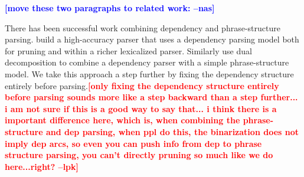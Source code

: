 \documentclass[11pt,letterpaper]{article}
\newcommand{\rules}{\mathcal{R}}
\newcommand{\ParseName}{\textsc{ParPar}}
\newcommand{\lpkcomment}[1]{\textcolor{red}{\bf \small [#1 --lpk]}}
\newcommand{\nascomment}[1]{\textcolor{blue}{\bf \small [#1 --nas]}}
\begin{document}










\nascomment{move these two paragraphs to related work:}

There has been successful work combining dependency and phrase-structure parsing.  build a
high-accuracy parser that uses a dependency parsing model both for
pruning and within a richer lexicalized parser. Similarly
 use dual decomposition to combine a dependency
parser with a simple phrase-structure model. We take this
approach a step further by fixing the dependency structure
entirely before parsing.\lpkcomment{only fixing the dependency structure
entirely before parsing sounds more like a step backward than a step further... i am not sure if this is a good way to say that... i think there is a important difference here, which is, when combining the phrase-structure and dep parsing, when ppl do this, the binarization does not imply dep arcs, so even you can push info from dep to phrase structure parsing, you can't directly pruning so much like we do here...right?}
\end{document}
